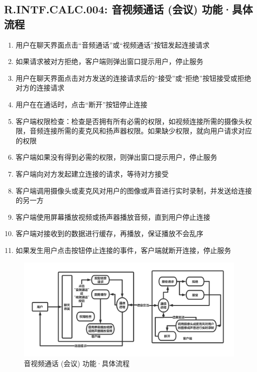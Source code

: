     \subsection{R.INTF.CALC.004: 音视频通话 (会议) 功能·具体流程}
    \begin{enumerate}
        \item 用户在聊天界面点击“音频通话”或“视频通话”按钮发起连接请求
        \item 如果请求被对方拒绝，客户端则弹出窗口提示用户，停止服务
        \item 用户在聊天界面点击对方发送的连接请求后的“接受”或“拒绝”按钮接受或拒绝对方的连接请求
        \item 用户在在通话时，点击“断开”按钮停止连接
        \item 客户端权限检查：检查是否拥有所有必需的权限，如视频连接所需的摄像头权限，音频连接所需的麦克风和扬声器权限。如果缺少权限，就向用户请求对应的权限
        \item 客户端如果没有得到必需的权限，则弹出窗口提示用户，停止服务
        \item 客户端向对方发起建立连接的请求，等待对方接受
        \item 客户端调用摄像头或麦克风对用户的图像或声音进行实时录制，并发送给连接的另一方
        \item 客户端使用屏幕播放视频或扬声器播放音频，直到用户停止连接
        \item 客户端对接收到的数据进行缓存，再播放，保证播放不会乱序
        \item 如果发生用户点击按钮停止连接的事件，客户端就断开连接，停止服务
    \end{enumerate}
        \begin{figure}[h]
            \centering
            \includegraphics[scale=0.4]{OutlineDesign/figures/音视频通话会议功能·具体流程.png}
            \caption{音视频通话 (会议) 功能·具体流程}
            \label{fig:server_flow}
        \end{figure}
